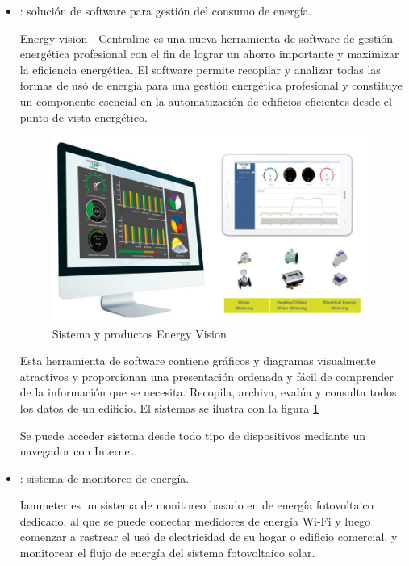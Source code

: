 \begin{itemize}
\item {}: solución de software para gestión del consumo de energía.

Energy vision - Centraline es una nueva herramienta de software de gestión energética profesional con el fin de lograr un ahorro importante y maximizar la eficiencia energética. El software permite recopilar y analizar todas las formas de usó de energía para una gestión energética profesional y constituye un componente esencial en la automatización de edificios eficientes desde el punto de vista energético.

\begin{figure}[htbp]
\centering
\includegraphics[width=.8\textwidth]{./Figures/energy-vision.jpg}
\caption{Sistema y productos Energy Vision \protect\footnotemark}
\label{fig:energy-vision}
\end{figure}


Esta herramienta de software contiene gráficos y diagramas visualmente atractivos y proporcionan una presentación ordenada y fácil de comprender de la información que se necesita. Recopila, archiva, evalúa y consulta todos los datos de un edificio. El sistemas se ilustra con la figura \ref{fig:energy-vision}

Se puede acceder sistema desde todo tipo de dispositivos mediante un navegador con Internet.

\vspace{1cm}
\vspace{1cm}

\item {}: sistema de monitoreo de energía.

Iammeter es un sistema de monitoreo basado en de energía fotovoltaico dedicado, al que se puede conectar medidores de energía Wi-Fi y luego comenzar a rastrear el usó de electricidad de su hogar o edificio comercial, y monitorear el flujo de energía del sistema fotovoltaico solar.


\end{itemize}
